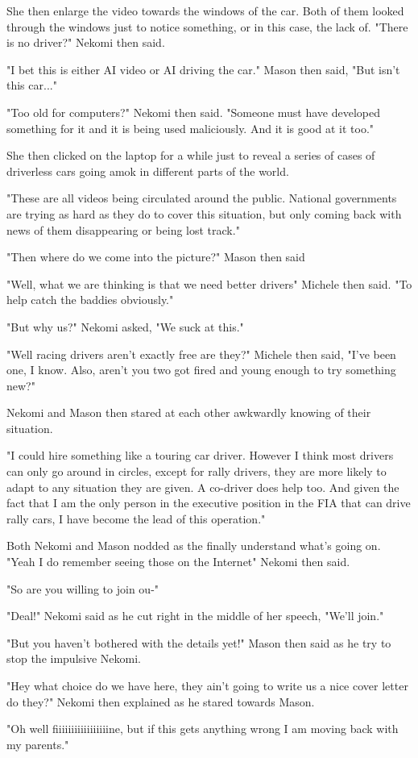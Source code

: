 She then enlarge the video towards the windows of the car. Both of them looked through the windows just to notice something, or in this case, the lack of. "There is no driver?" Nekomi then said. 

"I bet this is either AI video or AI driving the car." Mason then said, "But isn't this car..."

"Too old for computers?" Nekomi then said. "Someone must have developed something for it and it is being used maliciously. And it is good at it too."

She then clicked on the laptop for a while just to reveal a series of cases of driverless cars going amok in different parts of the world. 

"These are all videos being circulated around the public. National governments are trying as hard as they do to cover this situation, but only coming back with news of them disappearing or being lost track."

"Then where do we come into the picture?" Mason then said

"Well, what we are thinking is that we need better drivers" Michele then said. "To help catch the baddies obviously."

"But why us?" Nekomi asked, "We suck at this."

"Well racing drivers aren't exactly free are they?" Michele then said, "I've been one, I know. Also, aren't you two got fired and young enough to try something new?"

Nekomi and Mason then stared at each other awkwardly knowing of their situation. 

"I could hire something like a touring car driver. However I think most drivers can only go around in circles, except for rally drivers, they are more likely to adapt to any situation they are given. A co-driver does help too. And given the fact that I am the only person in the executive position in the FIA that can drive rally cars, I have become the lead of this operation."

Both Nekomi and Mason nodded as the finally understand what's going on. "Yeah I do remember seeing those on the Internet" Nekomi then said. 

"So are you willing to join ou-"

"Deal!" Nekomi said as he cut right in the middle of her speech, "We'll join."

"But you haven't bothered with the details yet!" Mason then said as he try to stop the impulsive Nekomi. 

"Hey what choice do we have here, they ain't going to write us a nice cover letter do they?" Nekomi then explained as he stared towards Mason. 

"Oh well fiiiiiiiiiiiiiiiiine, but if this gets anything wrong I am moving back with my parents."
